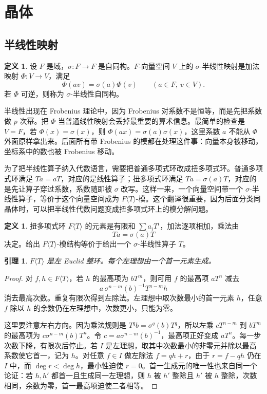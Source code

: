 \documentclass[11pt,a4paper,openany]{ctexbook}
\numberwithin{equation}{chapter}
\theoremstyle{plain}
\newtheorem{lemma}[theorem]{引理}
\theoremstyle{definition}
\newtheorem{definition}[theorem]{定义}
\theoremstyle{remark}
\begin{document}
\section{晶体}

\subsection{半线性映射}

\begin{definition}
设 $F$ 是域，$\sigma:F\to F$ 是自同构。$F$-向量空间 $V$ 上的 $\sigma$-半线性映射是加法映射 $\Phi:V\to V$，满足
\[
  \Phi(av)=\sigma(a)\Phi(v)\qquad(a\in F,\ v\in V).
\]
若 $\Phi$ 可逆，则称为 $\sigma$-半线性自同构。
\end{definition}

半线性出现在 Frobenius 理论中，因为 Frobenius 对系数不是恒等，而是先把系数做 $p$ 次幂。把 $\Phi$ 当普通线性映射会丢掉最重要的算术信息。最简单的检查是 $V=F$，若 $\Phi(x)=\sigma(x)$，则 $\Phi(ax)=\sigma(a)\sigma(x)$，这里系数 $a$ 不能从 $\Phi$ 外面原样拿出来。后面所有带 Frobenius 的模都在处理这件事：向量本身被移动，坐标系中的数也被 Frobenius 移动。

为了把半线性算子纳入代数语言，需要把普通多项式环改成扭多项式环。普通多项式环满足 $Ta=aT$，对应的是线性算子；扭多项式环满足 $Ta=\sigma(a)T$，对应的是先让算子穿过系数，系数随即被 $\sigma$ 改写。这样一来，一个向量空间带一个 $\sigma$-半线性算子，等价于这个向量空间成为 $F\langle T\rangle$-模。这个翻译很重要，因为后面分类同晶体时，可以把半线性代数问题变成扭多项式环上的模分解问题。

\begin{definition}
扭多项式环 $F\langle T\rangle$ 的元素是有限和 $\sum a_iT^i$，加法逐项相加，乘法由
\[
  T a=\sigma(a)T
\]
决定。给出 $F\langle T\rangle$-模结构等价于给出一个 $\sigma$-半线性算子 $T$。
\end{definition}

\begin{lemma}
$F\langle T\rangle$ 是左 Euclid 整环。每个左理想由一个首一元素生成。
\end{lemma}

\begin{proof}
对 $f,h\in F\langle T\rangle$，若 $h$ 的最高项为 $bT^m$，则可用 $f$ 的最高项 $aT^n$ 减去
\[
  a\,\sigma^{n-m}(b)^{-1}T^{n-m}h
\]
消去最高次数。重复有限次得到左除法。左理想中取次数最小的首一元素 $h$，任意 $f$ 除以 $h$ 的余数仍在左理想中，次数更小，只能为零。

这里要注意左右方向。因为乘法规则是 $T^q b=\sigma^q(b)T^q$，所以左乘 $cT^{n-m}$ 到 $bT^m$ 的最高项为 $c\sigma^{n-m}(b)T^n$。令 $c=a\sigma^{n-m}(b)^{-1}$，最高项正好变成 $aT^n$。每一步次数下降，有限次后停止。若 $I$ 是左理想，取其中次数最小的非零元并除以最高系数使它首一，记为 $h$。对任意 $f\in I$ 做左除法 $f=qh+r$，由于 $r=f-qh$ 仍在 $I$ 中，而 $\deg r<\deg h$，最小性迫使 $r=0$。首一生成元的唯一性也来自同一个论证：若 $h,h'$ 都首一且生成同一左理想，则 $h$ 被 $h'$ 整除且 $h'$ 被 $h$ 整除，次数相同，余数为零，首一最高项迫使二者相等。
\end{proof}
\end{document}
